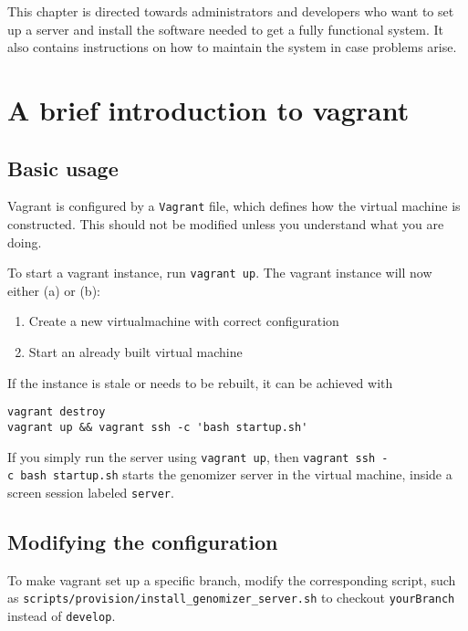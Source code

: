 This chapter is directed towards administrators and developers who want to
set up a server and install the software needed to get a fully functional system.
It also contains instructions on how to maintain the system in case problems arise.

\section{A brief introduction to
vagrant}\label{a-brief-introduction-to-vagrant}

\subsection{Basic usage}\label{basic-usage}

Vagrant is configured by a \texttt{Vagrant} file, which defines how the
virtual machine is constructed. This should not be modified unless you
understand what you are doing.

To start a vagrant instance, run \texttt{vagrant\ up}. The vagrant
instance will now either (a) or (b):

\begin{enumerate}
\def\labelenumi{\alph{enumi})}
\itemsep1pt\parskip0pt
\item
  Create a new virtualmachine with correct configuration
\item
  Start an already built virtual machine
\end{enumerate}

If the instance is stale or needs to be rebuilt, it can be achieved with

\begin{verbatim}
vagrant destroy
vagrant up && vagrant ssh -c 'bash startup.sh'
\end{verbatim}

If you simply run the server using \texttt{vagrant\ up}, then
\texttt{vagrant\ ssh\ -c\ \textquotesingle{}bash\ startup.sh\textquotesingle{}}
starts the genomizer server in the virtual machine, inside a screen
session labeled \texttt{server}.

\subsection{Modifying the
configuration}\label{modifying-the-configuration}

To make vagrant set up a specific branch, modify the corresponding
script, such as \texttt{scripts/provision/install\_genomizer\_server.sh}
to checkout \texttt{yourBranch} instead of \texttt{develop}.

